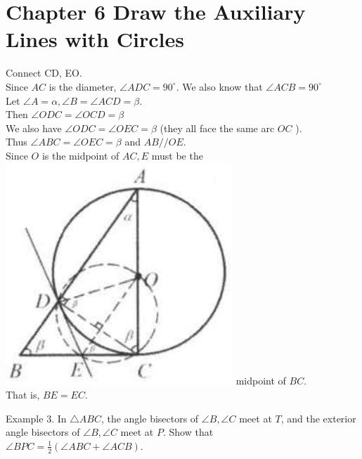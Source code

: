 \documentclass[10pt]{article}
\begin{document}
\section*{Chapter 6 Draw the Auxiliary Lines with Circles}
Connect CD, EO.\\
Since \(A C\) is the diameter, \(\angle A D C=90^{\circ}\). We also know that \(\angle A C B=90^{\circ}\)\\
Let \(\angle A=\alpha, \angle B=\angle A C D=\beta\).\\
Then \(\angle O D C=\angle O C D=\beta\)\\
We also have \(\angle O D C=\angle O E C=\beta\) (they all face the same arc \(O C\) ).\\
Thus \(\angle A B C=\angle O E C=\beta\) and \(A B / / O E\).\\
Since \(O\) is the midpoint of \(A C, E\) must be the\\
\includegraphics[max width=\textwidth]{2025_04_17_97bc1f7e44d93c271a88g-195(2)} midpoint of \(B C\).\\
That is, \(B E=E C\).

Example 3. In \(\triangle A B C\), the angle bisectors of \(\angle B, \angle C\) meet at \(T\), and the exterior angle bisectors of \(\angle B, \angle C\) meet at \(P\). Show that\\
\(\angle B P C=\frac{1}{2}(\angle A B C+\angle A C B)\).
\end{document}
